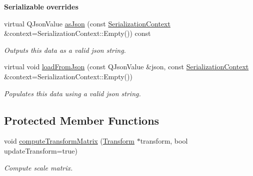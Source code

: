 \begin{Indent}\textbf{ Serializable overrides}\par
\begin{DoxyCompactItemize}
\item 
\mbox{\label{classrev_1_1_scale_component_a2b4929de363e5e31bb00a5471d197082}} 
virtual Q\+Json\+Value \mbox{\hyperlink{classrev_1_1_scale_component_a2b4929de363e5e31bb00a5471d197082}{as\+Json}} (const \mbox{\hyperlink{structrev_1_1_serialization_context}{Serialization\+Context}} \&context=Serialization\+Context\+::\+Empty()) const
\begin{DoxyCompactList}\small\item\em Outputs this data as a valid json string. \end{DoxyCompactList}\item 
\mbox{\label{classrev_1_1_scale_component_a573fc5b73bb1561662edddb06977c63e}} 
virtual void \mbox{\hyperlink{classrev_1_1_scale_component_a573fc5b73bb1561662edddb06977c63e}{load\+From\+Json}} (const Q\+Json\+Value \&json, const \mbox{\hyperlink{structrev_1_1_serialization_context}{Serialization\+Context}} \&context=Serialization\+Context\+::\+Empty())
\begin{DoxyCompactList}\small\item\em Populates this data using a valid json string. \end{DoxyCompactList}\end{DoxyCompactItemize}
\end{Indent}
\subsection*{Protected Member Functions}
\begin{DoxyCompactItemize}
\item 
\mbox{\label{classrev_1_1_scale_component_a7b60d3f3263389c24c351ba28fc560fe}} 
void \mbox{\hyperlink{classrev_1_1_scale_component_a7b60d3f3263389c24c351ba28fc560fe}{compute\+Transform\+Matrix}} (\mbox{\hyperlink{classrev_1_1_transform}{Transform}} $\ast$transform, bool update\+Transform=true)
\begin{DoxyCompactList}\small\item\em Compute scale matrix. \end{DoxyCompactList}\end{DoxyCompactItemize}
